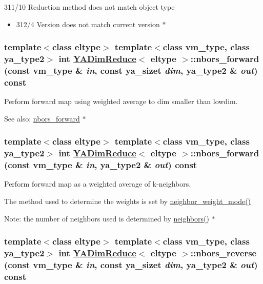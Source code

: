 311/10 Reduction method does not match object type\begin{itemize}
\item 312/4 Version does not match current version $\ast$ \end{itemize}
\hypertarget{class_y_a_dim_reduce_a34}{
\subsubsection[nbors\_\-forward]{\setlength{\rightskip}{0pt plus 5cm}template$<$class eltype$>$ template$<$class vm\_\-type, class ya\_\-type2$>$ int \hyperlink{class_y_a_dim_reduce}{YADim\-Reduce}$<$ eltype $>$::nbors\_\-forward (const vm\_\-type \& {\em in}, const ya\_\-sizet {\em dim}, ya\_\-type2 \& {\em out}) const}}
\label{class_y_a_dim_reduce_a34}


Perform forward map using weighted average to dim smaller than lowdim. 

\begin{Desc}
\item[See also:]\hyperlink{class_y_a_dim_reduce_a32}{nbors\_\-forward} $\ast$ \end{Desc}
\hypertarget{class_y_a_dim_reduce_a32}{
\subsubsection[nbors\_\-forward]{\setlength{\rightskip}{0pt plus 5cm}template$<$class eltype$>$ template$<$class vm\_\-type, class ya\_\-type2$>$ int \hyperlink{class_y_a_dim_reduce}{YADim\-Reduce}$<$ eltype $>$::nbors\_\-forward (const vm\_\-type \& {\em in}, ya\_\-type2 \& {\em out}) const}}
\label{class_y_a_dim_reduce_a32}


Perform forward map as a weighted average of k-neighbors. 

The method used to determine the weights is set by \hyperlink{class_y_a_dim_reduce_a27}{neighbor\_\-weight\_\-mode()} \begin{Desc}
\item[Note:]the number of neighbors used is determined by \hyperlink{class_y_a_dim_reduce_a21}{neighbors()} $\ast$ \end{Desc}
\hypertarget{class_y_a_dim_reduce_a35}{
\subsubsection[nbors\_\-reverse]{\setlength{\rightskip}{0pt plus 5cm}template$<$class eltype$>$ template$<$class vm\_\-type, class ya\_\-type2$>$ int \hyperlink{class_y_a_dim_reduce}{YADim\-Reduce}$<$ eltype $>$::nbors\_\-reverse (const vm\_\-type \& {\em in}, const ya\_\-sizet {\em dim}, ya\_\-type2 \& {\em out}) const}}
\label{class_y_a_dim_reduce_a35}


